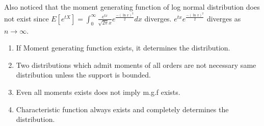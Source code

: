 \documentclass[../Transformation.tex]{subfiles}
\begin{document}
\begin{remark}
Also noticed that the moment generating function of log normal distribution does not exist since $E[e^{tX}]=\int_0^\infty\frac{e^{tx}}{\sqrt{2\pi}x}e^{\frac{-(\ln x)^2}{2}}dx$ diverges. $e^{tx}e^{\frac{-(\ln x)^2}{2}}$ diverges as $n\rightarrow\infty$.
\end{remark}
\begin{intuition}
\begin{enumerate}
\item If Moment generating function exists, it determines the distribution. 
\item Two distributions which admit moments of all orders are not necessary same distribution unless the support is bounded. 
\item Even all moments exists does not imply m.g.f exists. 
\item Characteristic function always exists and completely determines the distribution.
\end{enumerate}
\end{intuition}
\end{document}
